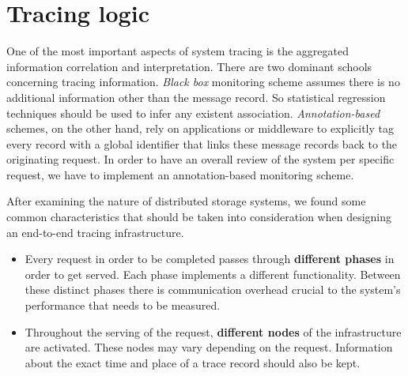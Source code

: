 \documentclass[a4paper,10pt,twocolumn]{article}
\begin{document}
\section{Tracing logic} One of the most important aspects of system tracing is
the aggregated information correlation and interpretation. There are two
dominant schools concerning tracing information. \emph{Black box} monitoring
scheme assumes there is no additional information other than the message record.
So statistical regression techniques should be used to infer any existent
association.  \emph{Annotation-based} schemes, on the other hand, rely on
applications or middleware to explicitly tag every record with a global
identifier that links these message records back to the originating request. In
order to have an overall review of the system per specific request, we have to
implement an annotation-based monitoring scheme.

After examining the nature of distributed storage systems, we found some common
characteristics that should be taken into consideration when designing an
end-to-end tracing infrastructure.  \begin{itemize} \item Every request in order
to be completed passes through \textbf{different phases} in order to get served.
Each phase implements a different functionality.  Between these distinct phases
there is communication overhead crucial to the system's performance that needs
to be measured.  \item Throughout the serving of the request, \textbf{different
nodes} of the infrastructure are activated. These nodes may vary depending on
the request.  Information about the exact time and place of a trace record
should also be kept.  \end{itemize}
\end{document}
